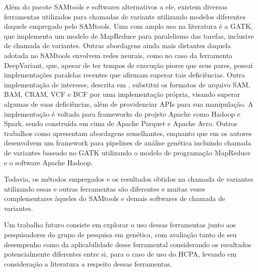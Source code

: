 \documentclass[cic,tc]{iiufrgs}
\begin{document}
Além do pacote SAMtools e softwares alternativos a ele, existem diversas
ferramentas utilizados para chamadas de variante utilizando modelos diferentes
daquele empregado pelo SAMtools. Uma com amplo uso na
literatura\cite{de2017gatk} é a GATK\cite{mckenna2010genome}, que implementa um
modelo de MapReduce para paralelismo das tarefas, inclusive de chamada de
variantes. Outras abordagens ainda mais distantes daquela adotada no SAMtools
envolvem redes neurais, como no caso da ferramenta
DeepVariant,\cite{poplin2018universal} que, apesar de ter tempos de execução
piores que seus pares, possui implementações paralelas recentes que afirmam
superar tais deficiências.\cite{ahmad2021vc} Outra implementação de interesse,
descrita em \cite{massie2013adam}, substitui os formatos de arquivo SAM, BAM,
CRAM, VCF e BCF por uma implementação própria, visando superar algumas de suas
deficiências, além de providenciar APIs para sua manipulação. A implementação é
voltada para frameworks do projeto Apache como Hadoop e Spark, sendo construída
em cima de Apache Parquet e Apache Avro.  Outros trabalhos como
\cite{boufea2017managing} apresentam abordagens semelhantes, enquanto que em
\cite{decap2015halvade} os autores desenvolvem um framework para pipelines de
análise genética incluindo chamada de variantes baseado no GATK utilizando o
modelo de programação MapReduce e o software Apache Hadoop. 

Todavia, os métodos empregados e os resultados obtidos na chamada de variantes
utilizando essas e outras ferramentas são diferentes e muitas vezes
complementares àqueles do SAMtools e demais softwares de chamada de
variantes.\cite{gezsi2015variantmetacaller}\cite{guo2015seqmule}

Um trabalho futuro consiste em explorar o uso dessas ferramentas junto aos
pesquisadores do grupo de pesquisa em genética, com avaliação tanto de seu
desempenho como da aplicabilidade desse ferramental considerando os resultados
potencialmente diferentes entre si, para o caso de uso do HCPA, levando em
consideração a literatura a respeito dessas ferramentas.



\end{document}
